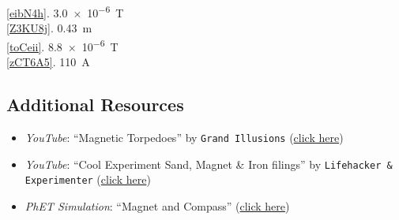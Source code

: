 \documentclass[main.tex]{subfiles}
\begin{document}
\ref{eibN4h}. \SI{3.0e-6}{T}\\
\ref{Z3KU8j}. \SI{0.43}{m}\\
\ref{toCeii}. \SI{8.8e-6}{T}\\
\ref{zCT6A5}. \SI{110}{A}\\



\subsection*{Additional Resources}

\begin{itemize}
    \item \textit{YouTube}: ``Magnetic Torpedoes'' by \texttt{Grand Illusions} (\href{https://youtu.be/jbGaSL6wJ8M}{click here})
    \item \textit{YouTube}: ``Cool Experiment Sand, Magnet \& Iron filings'' by \texttt{Lifehacker \& Experimenter} (\href{https://youtu.be/tfiebTsJDno}{click here})
    \item \textit{PhET Simulation}: ``Magnet and Compass'' (\href{https://phet.colorado.edu/en/simulation/legacy/magnet-and-compass}{click here})
\end{itemize}




\clearpage
\printnoidxglossaries
\end{document}
